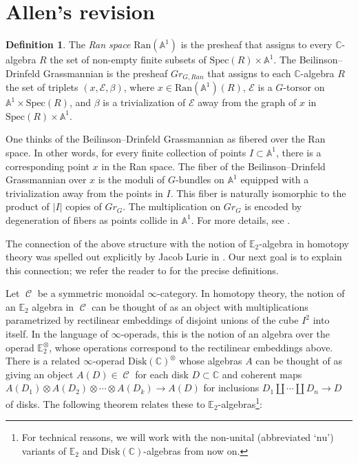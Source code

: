 \documentclass[reqno, oneside]{amsart}
\theoremstyle{definition}
\newtheorem{dfn}[nul]{Definition}
\theoremstyle{plain}
\DeclareMathOperator{\C}{\mathcal{C}}
\begin{document}


\section{Allen's revision}

\begin{dfn}
The \textit{Ran space} $\text{Ran}(\mathbb{A}^1)$ is the presheaf that assigns to every $\mathbb{C}$-algebra $R$ the set of non-empty finite subsets of $\text{Spec}(R) \times \mathbb{A}^1$.   The Beilinson--Drinfeld Grassmannian is the presheaf $Gr_{G,Ran}$ that assigns to each $\mathbb{C}$-algebra $R$ the set of triplets $(x,\mathcal{E},\beta)$, where $x \in \text{Ran}(\mathbb{A}^1)(R)$, $\mathcal{E}$ is a $G$-torsor on $\mathbb{A}^1 \times \text{Spec}(R)$, and $\beta$ is a trivialization of $\mathcal{E}$ away from the graph of $x$ in $\text{Spec}(R) \times \mathbb{A}^1 $.
\end{dfn}



One thinks of the Beilinson--Drinfeld Grassmannian as fibered over the Ran space.  In other words, for every finite collection of points $I \subset \mathbb{A}^1$, there is a corresponding point $x$ in the Ran space.  The fiber of the Beilinson--Drinfeld Grassmannian over $x$ is the moduli of $G$-bundles on $\mathbb{A}^1$ equipped with a trivialization away from the points in $I$.  This fiber is naturally isomorphic to the product of $|I|$ copies of $Gr_G$.  The multiplication on $Gr_G$ is encoded by degeneration of fibers as points collide in $\mathbb{A}^1$.  For more details, see \cite[\S 3]{Zhu}.

The connection of the above structure with the notion of $\mathbb{E}_2$-algebra in homotopy theory was spelled out explicitly by Jacob Lurie in \cite[\S 5.5]{HA}.  Our next goal is to explain this connection; we refer the reader to \cite[\S 5.5]{HA} for the precise definitions.  

Let $\C$ be a symmetric monoidal $\infty$-category.  In homotopy theory, the notion of an $\mathbb{E}_2$ algebra in $\C$ can be thought of as an object with multiplications parametrized by rectilinear embeddings of disjoint unions of the cube $I^2$ into itself.  In the language of $\infty$-operads, this is the notion of an algebra over the operad $\mathbb{E}_2^{\otimes}$, whose operations correspond to the rectilinear embeddings above.  There is a related $\infty$-operad $\mathrm{Disk}(\mathbb{C})^\otimes$ whose algebras $A$ can be thought of as giving an object $A(D)\in\C$ for each disk $D\subset \mathbb{C}$ and coherent maps $A(D_1)\otimes A(D_2)\otimes \cdots \otimes A(D_k) \to A(D)$ for inclusions $D_1\coprod \cdots \coprod D_n \to D$ of disks. The following theorem relates these to $\mathbb{E}_2$-algebras\footnote{For technical reasons, we will work with the non-unital (abbreviated `$\mathrm{nu}$') variants of $\mathbb{E}_2$ and $\mathrm{Disk}(\mathbb{C})$-algebras from now on.}:
\end{document}
